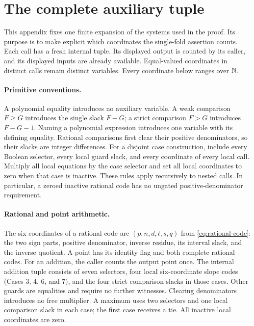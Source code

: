 \section{The complete auxiliary tuple}\label{app:witnesses}

This appendix fixes one finite expansion of the systems used in the proof.
Its purpose is to make explicit which coordinates the single-fold assertion
counts. Each call has a fresh internal tuple. Its displayed output is
counted by its caller, and its displayed inputs are already available.
Equal-valued coordinates in distinct calls remain distinct variables.
Every coordinate below ranges over \(\mathbb N\).

\paragraph{Primitive conventions.}
A polynomial equality introduces no auxiliary variable. A weak comparison
\(F\ge G\) introduces the single slack \(F-G\); a strict comparison
\(F>G\) introduces \(F-G-1\). Naming a polynomial expression introduces
one variable with its defining equality. Rational comparisons first clear
their positive denominators, so their slacks are integer differences.
For a disjoint case construction,
include every Boolean selector, every local guard slack, and every
coordinate of every local call. Multiply all local equations by the case
selector and set all local coordinates to zero when that case is inactive.
These rules apply recursively to nested calls. In particular, a zeroed
inactive rational code has no ungated positive-denominator requirement.

\paragraph{Rational and point arithmetic.}
The six coordinates of a rational code are
\((p,n,d,t,s,q)\) from \eqref{eq:rational-code}: the two sign parts,
positive denominator, inverse residue, its interval slack, and the inverse
quotient. A point has its identity flag and both complete rational codes.
For an addition, the caller counts the output point once. The internal
addition tuple consists of seven selectors, four local
six-coordinate slope codes (Cases 3, 4, 6, and 7), and the four strict
comparison slacks in those cases. Other guards are equalities and require
no further witnesses. Clearing denominators introduces no free multiplier.
A maximum uses two selectors and one local comparison slack in each case;
the first case receives a tie. All inactive local coordinates are zero.

